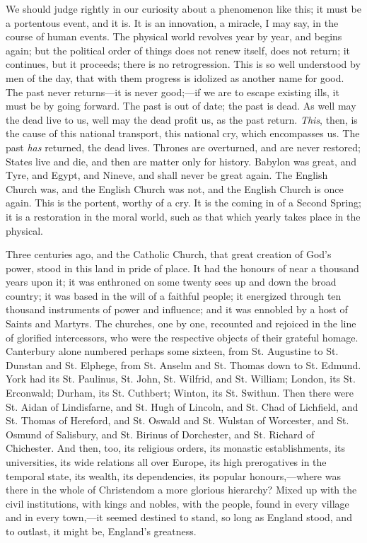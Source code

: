 We should judge rightly in our curiosity about a
phenomenon like this; it must be a portentous event, and
it is. It is an innovation, a miracle, I may say, in the
course of human events. The physical world revolves year
by year, and begins again; but the political order of
things does not renew itself, does not return; it
continues, but it proceeds; there is no retrogression.
This is so well understood by men of the day, that with
them progress is idolized as another name for good. The
past never returns—it is never good;—if we are
to escape existing ills, it must be by going forward. The
past is out of date; the past is dead. As well may the
dead live to us, well may the dead profit us, as the past
return. \emph{This}, then, is the cause of this national
transport, this national cry, which encompasses us. The
past \emph{has} returned, the dead lives. Thrones are
overturned, and are never restored; States live and die,
and then are matter only for history. Babylon was great,
and Tyre, and Egypt, and Nineve, and shall never be great
again. The English Church was, and the English Church was
not, and the English Church is once again. This is the
portent, worthy of a cry. It is the coming in of a Second
Spring; it is a restoration in the moral world, such as
that which yearly takes place in the physical.

Three centuries ago, and the Catholic Church, that
great creation of God's power, stood in this land in
pride of place. It had the honours of near a thousand
years upon it; it was enthroned on some twenty sees up
and down the broad country; it was based in the will of a
faithful people; it energized through ten thousand
instruments of power and influence; and it was ennobled
by a host of Saints and Martyrs. The churches, one by
one, recounted and rejoiced in the line of glorified
intercessors, who were the respective objects of their
grateful homage. Canterbury alone numbered perhaps some
sixteen, from St. Augustine to St. Dunstan and St.
Elphege, from St. Anselm and St. Thomas down to St.
Edmund. York had its St. Paulinus, St. John, St. Wilfrid,
and St. William; London, its St. Erconwald; Durham, its
St. Cuthbert; Winton, its St. Swithun. Then there were
St. Aidan of Lindisfarne, and St. Hugh of Lincoln, and
St. Chad of Lichfield, and St. Thomas of Hereford, and
St. Oswald and St. Wulstan of Worcester, and St. Osmund
of Salisbury, and St. Birinus of Dorchester, and St.
Richard of Chichester. And then, too, its religious
orders, its monastic establishments, its universities,
its wide relations all over Europe, its high prerogatives
in the temporal state, its wealth, its dependencies, its
popular honours,—where was there in the whole of
Christendom a more glorious hierarchy? Mixed up with the
civil institutions, with kings and nobles, with the
people, found in every village and in every town,—it
seemed destined to stand, so long as England stood, and
to outlast, it might be, England's greatness.

